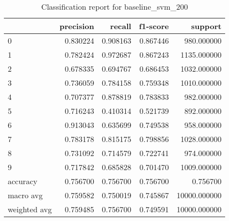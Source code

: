 \begin{table}[htb!]
\centering
\caption{Classification report for baseline_svm_200}
\label{tab:classification-report-baseline_svm_200}
\begin{tabular}{lrrrr}
\toprule
 & precision & recall & f1-score & support \\
\midrule
0 & 0.830224 & 0.908163 & 0.867446 & 980.000000 \\
1 & 0.782424 & 0.972687 & 0.867243 & 1135.000000 \\
2 & 0.678335 & 0.694767 & 0.686453 & 1032.000000 \\
3 & 0.736059 & 0.784158 & 0.759348 & 1010.000000 \\
4 & 0.707377 & 0.878819 & 0.783833 & 982.000000 \\
5 & 0.716243 & 0.410314 & 0.521739 & 892.000000 \\
6 & 0.913043 & 0.635699 & 0.749538 & 958.000000 \\
7 & 0.783178 & 0.815175 & 0.798856 & 1028.000000 \\
8 & 0.731092 & 0.714579 & 0.722741 & 974.000000 \\
9 & 0.717842 & 0.685828 & 0.701470 & 1009.000000 \\
accuracy & 0.756700 & 0.756700 & 0.756700 & 0.756700 \\
macro avg & 0.759582 & 0.750019 & 0.745867 & 10000.000000 \\
weighted avg & 0.759485 & 0.756700 & 0.749591 & 10000.000000 \\
\bottomrule
\end{tabular}
\end{table}
